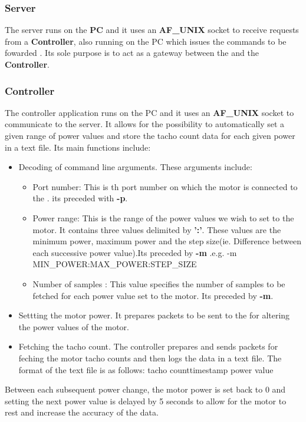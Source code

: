 \subsubsection{Server}
\label{sec:server}

The server runs on the \textbf{PC} and it uses an \textbf{AF\_UNIX} socket to receive requests from a \textbf{Controller}, also running on the PC which issues the commands to be fowarded \LEGO . Its sole purpose is to act as a gateway between the \LEGO and the \textbf{Controller}.

\subsubsection{Controller}
\label{sec:controller}
The controller application runs on the PC and it uses an \textbf{AF\_UNIX} socket to communicate to the server. It allows for the possibility to automatically set a given range of power values and store the tacho count data for each given power in a text file.
\newline
Its main  functions include:
\begin{itemize}
	\item Decoding of command line arguments. These arguments include:
    	\begin{itemize}
        	\item Port number: This is th port number on which the motor is connected to the \LEGO . its preceded with \textbf{-p}.
            \item Power range: This is the range of the power values we wish to set to the motor. It contains three values delimited by \textbf{':'}. These values are the minimum power, maximum power and the step size(ie. Difference between each successive power value).Its preceded by \textbf{-m} .e.g. -m MIN\_POWER:MAX\_POWER:STEP\_SIZE 
            \item Number of samples : This value specifies the number of samples to be fetched for each power value set to the motor. Its preceded by \textbf{-m}.
        \end{itemize}
     \item Settting the motor power. It prepares packets to be sent to the \LEGO for altering the power values of the motor.
     \item Fetching the tacho count. The controller prepares and sends packets for feching the motor tacho counts and then logs the data in a text file. The format of the text file is as follows:
     \newline
     \hfill \textlangle tacho count\textrangle  \textlangle timestamp \textrangle \textlangle power value \textrangle
\end{itemize}
Between each subsequent power change, the motor power is set back to 0 and setting the next power value is delayed by 5 seconds to allow for the motor to rest and increase the accuracy of the data.

